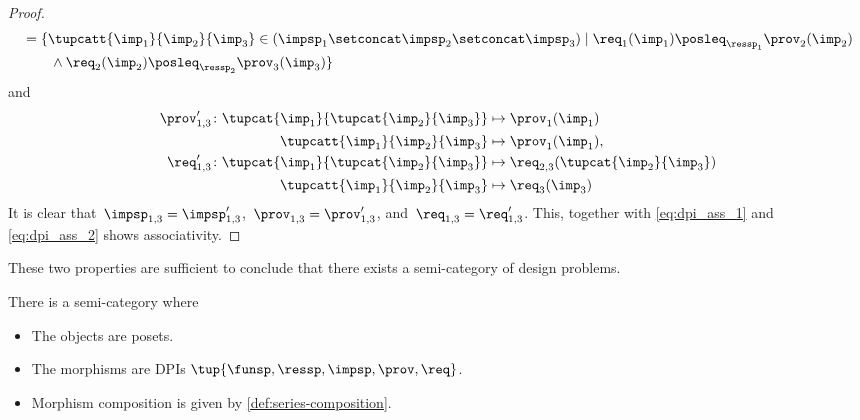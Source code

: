 \begin{proof}
\begin{equation}
\begin{aligned}
                          & =\{  \tupcatt{\imp_{1}}{\imp_{2}}{\imp_{3}} \in (\impsp_{1} \setconcat \impsp_{2}\setconcat \impsp_{3})\mid\req_{1}(\imp_{1})\posleq_{\ressp_{1}}\prov_{2}(\imp_2)                                          \\
                          & \qquad \wedge \req_2(\imp_2)\posleq_{\ressp_2}\prov_3(\imp_3)\}                                                                                                                                             \\
        \end{aligned}
    \end{equation}
    and
    \begin{equation}
        \begin{aligned}
            \prov'_{1,3} \colon  \tupcat {\imp_{1}}{\tupcat {\imp_{2}} {\imp_{3}}} & \mapsto\prov_{1}(\imp_{1})                       \\
            \tupcatt{\imp_{1}}{\imp_{2}}{\imp_{3}}                                 & \mapsto\prov_{1}(\imp_{1}),                      \\
            \req'_{1,3} \colon  \tupcat {\imp_{1}}{\tupcat {\imp_{2}} {\imp_{3}}}  & \mapsto\req_{2,3}(\tupcat {\imp_{2}} {\imp_{3}}) \\
            \tupcatt{\imp_{1}}{\imp_{2}}{\imp_{3}}                                 & \mapsto \req_{3}(\imp_{3})                       
        \end{aligned}
    \end{equation}
    It is clear that~$\impsp_{1,3}=\impsp'_{1,3}$,~$\prov_{1,3}=\prov'_{1,3}$, and~$\req_{1,3}=\req'_{1,3}$.
    This, together with \cref{eq:dpi_ass_1} and \cref{eq:dpi_ass_2} shows associativity.
\end{proof}

These two properties are sufficient to conclude that there exists a semi-category of design problems.

\begin{definition}
    \label{def:DPIcat}
    There is a semi-category \DPI where
    \begin{itemize}
        \item The objects are posets.
        \item The morphisms are DPIs $\tup{\funsp,\ressp,\impsp,\prov,\req}$.
        \item Morphism composition is given by \cref{def:series-composition}.
    \end{itemize}
\end{definition}


